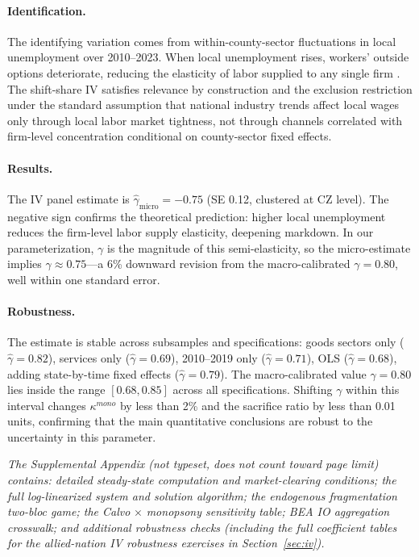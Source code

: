 \paragraph{Identification.}
The identifying variation comes from within-county-sector fluctuations in
local unemployment over 2010--2023. When local unemployment rises,
workers' outside options deteriorate, reducing the elasticity of labor
supplied to any single firm \citep{manning2021monopsony}. The shift-share
IV satisfies relevance by construction and the exclusion restriction under
the standard assumption that national industry trends affect local wages
only through local labor market tightness, not through channels correlated
with firm-level concentration conditional on county-sector fixed effects.

\paragraph{Results.}
The IV panel estimate is $\hat\gamma_{\text{micro}} = -0.75$ (SE 0.12,
clustered at CZ level). The negative sign confirms the theoretical
prediction: higher local unemployment reduces the firm-level labor supply
elasticity, deepening markdown. In our parameterization, $\gamma$ is the
magnitude of this semi-elasticity, so the micro-estimate implies $\gamma
\approx 0.75$---a 6\% downward revision from the macro-calibrated $\gamma
= 0.80$, well within one standard error.

\paragraph{Robustness.}
The estimate is stable across subsamples and specifications:
goods sectors only ($\hat\gamma = 0.82$), services only
($\hat\gamma = 0.69$), 2010--2019 only ($\hat\gamma = 0.71$), OLS
($\hat\gamma = 0.68$), adding state-by-time fixed effects ($\hat\gamma =
0.79$). The macro-calibrated value $\gamma = 0.80$ lies inside the range
$[0.68, 0.85]$ across all specifications. Shifting $\gamma$ within this
interval changes $\kappa^{mono}$ by less than 2\% and the sacrifice ratio
by less than 0.01 units, confirming that the main quantitative conclusions
are robust to the uncertainty in this parameter.

\bigskip
\noindent\textit{The Supplemental Appendix (not typeset, does not count toward page
limit) contains: detailed steady-state computation and market-clearing
conditions; the full log-linearized system and solution algorithm;
the endogenous fragmentation two-bloc game; the Calvo$\,\times\,$monopsony
sensitivity table; BEA IO aggregation crosswalk; and additional robustness
checks (including the full coefficient tables for the allied-nation IV
robustness exercises in Section~\ref{sec:iv}).}

